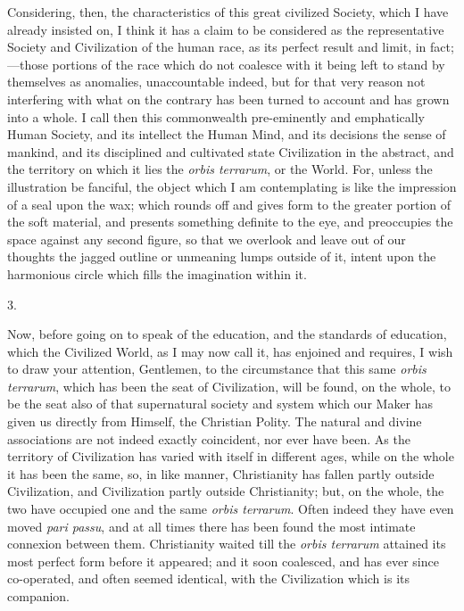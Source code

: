 Considering, then, the characteristics of this great civilized
Society, which I have already insisted on, I think it has a claim to
be considered as the representative Society and Civilization of the
human race, as its perfect result and limit, in fact;—those portions
of the race which do not coalesce with it being left to stand by
themselves as anomalies, unaccountable indeed, but for that very
reason not interfering with what on the contrary has been turned to
account and has grown into a whole. I call then this commonwealth
pre-eminently and emphatically Human Society, and its intellect the
Human Mind, and its decisions the sense of mankind, and its
disciplined and cultivated state Civilization in the abstract, and the
territory on which it lies the \emph{orbis terrarum}, or the World.
For, unless the illustration be fanciful, the object which I am
contemplating is like the impression of a seal upon the wax; which
rounds off and gives form to the greater portion of the soft material,
and presents something definite to the eye, and preoccupies the space
against any second figure, so that we overlook and leave out of our
thoughts the jagged outline or unmeaning lumps outside of it, intent
upon the harmonious circle which fills the imagination within it.

3.

Now, before going on to speak of the education, and the standards
of education, which the Civilized World, as I may now call it, has
enjoined and requires, I wish to draw your attention, Gentlemen, to
the circumstance that this same \emph{orbis terrarum}, which has been
the seat of Civilization, will be found, on the whole, to be the seat
also of that supernatural society and system which our Maker has given
us directly from Himself, the Christian Polity. The natural and divine
associations are not indeed exactly coincident, nor ever have been. As
the territory of Civilization has varied with itself in different
ages, while on the whole it has been the same, so, in like manner,
Christianity has fallen partly outside Civilization, and Civilization
partly outside Christianity; but, on the whole, the two have
occupied one and the same \emph{orbis terrarum}. Often indeed they
have even moved \emph{pari passu}, and at all times there has been
found the most intimate connexion between them. Christianity waited
till the \emph{orbis terrarum} attained its most perfect form before
it appeared; and it soon coalesced, and has ever since co-operated,
and often seemed identical, with the Civilization which is its
companion.

